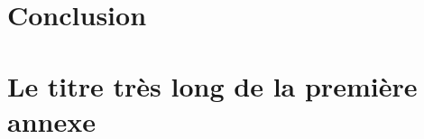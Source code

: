 \documentclass[12pt,twoside]{book}
\begin{document}
	
	
	\chapter*{Conclusion}
\newpage{\pagestyle{empty}\cleardoublepage}
	







\appendix %

\chapter[Titre court]{Le titre très long de la première annexe}

%

\newpage{\pagestyle{empty}\cleardoublepage}


\backmatter %

\tableofcontents
\end{document}
